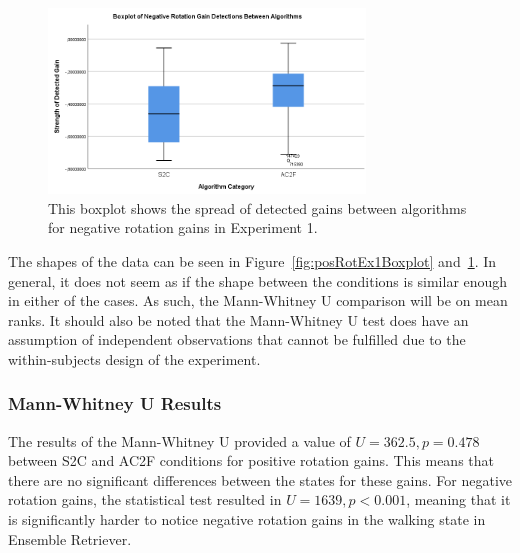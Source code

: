 \begin{figure}[tbph]
    \centering
    \includegraphics[width=0.75\textwidth]{figures/graphs/NegRotationDetectionBoxplot.png}
    \caption[Boxplot on Negative Rotation Detections in Experiment 1]{This boxplot shows the spread of detected gains between algorithms for negative rotation gains in Experiment 1.}
    \label{fig:negRotEx1Boxplot}
\end{figure}

The shapes of the data can be seen in Figure~\ref{fig:posRotEx1Boxplot} and~\ref{fig:negRotEx1Boxplot}. In general, it does not seem as if the shape between the conditions is similar enough in either of the cases. As such, the Mann-Whitney U comparison will be on mean ranks. It should also be noted that the Mann-Whitney U test does have an assumption of independent observations that cannot be fulfilled due to the within-subjects design of the experiment.

\subsubsection{Mann-Whitney U Results}
The results of the Mann-Whitney U provided a value of $U = 362.5, p = 0.478$ between S2C and AC2F conditions for positive rotation gains. This means that there are no significant differences between the states for these gains. For negative rotation gains, the statistical test resulted in $U = 1639, p < 0.001$, meaning that it is significantly harder to notice negative rotation gains in the walking state in Ensemble Retriever.

